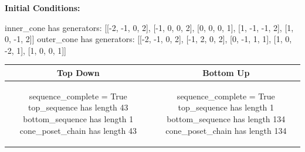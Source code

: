\documentclass[10pt]{article}
\begin{document}
\textbf{Initial Conditions:}
\begin{SAGE}
inner_cone has generators: 
[[-2, -1, 0, 2], [-1, 0, 0, 2], [0, 0, 0, 1], [1, -1, -1, 2], [1, 0, -1, 2]]
outer_cone has generators: 
[[-2, -1, 0, 2], [-1, 2, 0, 2], [0, -1, 1, 1], [1, 0, -2, 1], [1, 0, 0, 1]]

\end{SAGE}
\begin{tabular}{c|c}
\textbf{Top Down} & \textbf{Bottom Up} \\ \hline  
\begin{SAGE}
sequence_complete = True
top_sequence has length 43
bottom_sequence has length 1
cone_poset_chain has length 43
\end{SAGE} 
&
\begin{SAGE}
sequence_complete = True
top_sequence has length 1
bottom_sequence has length 134
cone_poset_chain has length 134
\end{SAGE} 
\\ \hline


\end{tabular}
\end{document}
